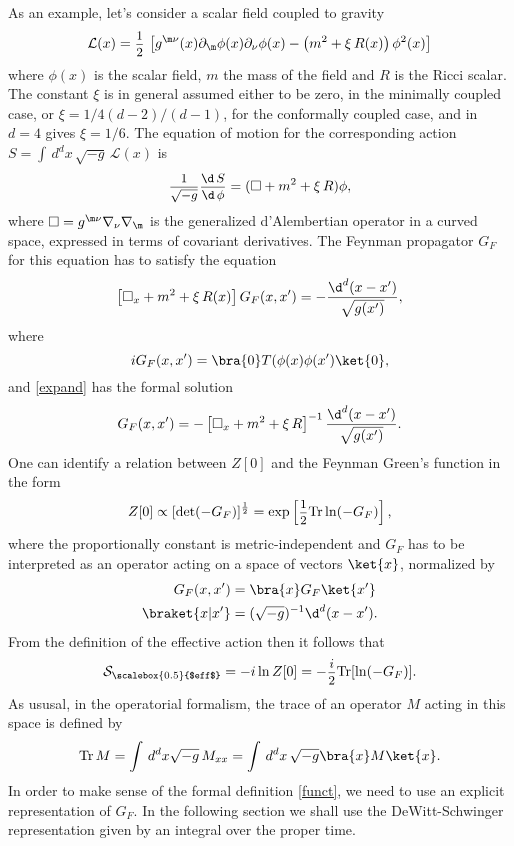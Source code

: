 \documentclass[a4paper,11pt,openright,twoside]{book}
\let\n=\nu      \let\x=\xi     \let\p=\pi      \let\r=\rho
\newcommand{\sdfrac}[2]{\mbox{\small$\displaystyle\frac{#1}{#2}$}}
\newcommand{\Tr}{\text{Tr}}
\numberwithin{equation}{section}
\begin{document}
{{{	As an example, let's consider a scalar field coupled to gravity
	\begin{equation}
		\mathcal{L}(x)=\sdfrac{1}{2}\,\left[g^{\m\n}(x)\partial_\m\phi(x)\partial_\n\phi(x)-\left(m^2+\x\,R(x)\right) \phi^2(x)\right]
	\end{equation}
	where $\phi(x)$ is the scalar field, $m$ the mass of the field and $R$ is the Ricci scalar.  The constant $\x$ is in general assumed either to be zero, in the minimally coupled case, or $\x=1/4(d-2)/(d-1)$, for the conformally coupled case, and in $d=4$ gives $\xi=1/6$. 
	The equation of motion for the corresponding action $S=\int\,d^dx\,\sqrt{-g}\,\mathcal{L}(x)$ is
	\begin{equation}
		\sdfrac{1}{\sqrt{-g}}\sdfrac{\d\,S}{\d\,\phi}=(\square+m^2+\x\,R)\phi,
	\end{equation}
	where $\square=g^{\m\n}\nabla_\n\nabla_\m$ is the generalized d'Alembertian operator in a curved space, expressed in terms of covariant derivatives. The Feynman propagator $G_F$ for this equation has to satisfy the equation
	\begin{equation}
		\left[\square_x+m^2+\x\,R(x)\right] G_F(x,x')=-\frac{\d^d(x-x')}{\sqrt{g(x')}},\label{expand}
	\end{equation}
	where
	\begin{equation}
		iG_F(x,x')=\bra{0}T(\phi(x)\phi(x')\ket{0},
\end{equation}}
and \eqref{expand} has the formal solution 
\begin{equation}
	G_F(x,x')=-\left[\square_x+m^2+\xi\,R\right]^{-1}\frac{\d^d(x-x')}{\sqrt{g(x')}}.
\end{equation}
One can identify a relation between $Z[0]$ and the Feynman Green's function in the form
\begin{equation}
	Z[0]\propto [\det(-G_F)]^{\frac{1}{2}}=\exp\left[\sdfrac{1}{2}\Tr\ln(-G_F)\right],
\end{equation}
where the proportionally constant is metric-independent and $G_F$ has to be interpreted as an operator acting on a space of vectors $\ket{x}$, normalized by 
\begin{align}
	G_F(x,x')&=\bra{x}G_F\ket{x'}\\
	\braket{x|x'}&=(\sqrt{-g})^{-1}\d^d(x-x').
\end{align}
From the definition of the effective action then it follows that
\begin{equation}
	\mathcal{S}_{\scalebox{0.5}{$eff$}}=-i\ln Z[0]=-\sdfrac{i}{2}\Tr[\ln(-G_F)].\label{funct}
\end{equation} 
As ususal, in the operatorial formalism, the trace of an operator $M$ acting in this space is defined by
\begin{equation}
	\Tr\,M=\int\,d^dx\sqrt{-g}\,M_{xx}=\int\,d^dx\,\sqrt{-g}\bra{x}M\ket{x}.
\end{equation}
In order to make sense of the formal definition \eqref{funct}, we need to use an explicit representation of $G_F$. In the following section we shall use the DeWitt-Schwinger representation given by an integral over the proper time.

}}
\end{document}
